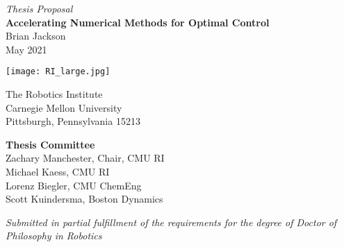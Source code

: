 \begin{titlepage}
    \begin{center}
        \vspace*{1.0in}
        {\LARGE \textit{Thesis Proposal}\\}
        \vspace{0.2in}
        {\Huge \textbf{
        Accelerating 
        Numerical Methods for
        Optimal Control 
        }} \\
        \vspace{0.2in}
        {\Large Brian Jackson} \\
        \vspace{0.2in}
        {\large May 2021}
        
        \vfill
        \texttt{[image: RI\_large.jpg]}

        The Robotics Institute \\
        Carnegie Mellon University \\
        Pittsburgh, Pennsylvania 15213 \\

        \vspace{0.2in}

        \textbf{Thesis Committee}\\
        Zachary Manchester, Chair, CMU RI \\
        Michael Kaess, CMU RI \\
        Lorenz Biegler, CMU ChemEng \\
        Scott Kuindersma, Boston Dynamics \\

        \vspace*{0.5in}

        \textit{Submitted in partial fulfillment of the requirements for the degree of Doctor of Philosophy in Robotics }\\

    \end{center}
\end{titlepage}